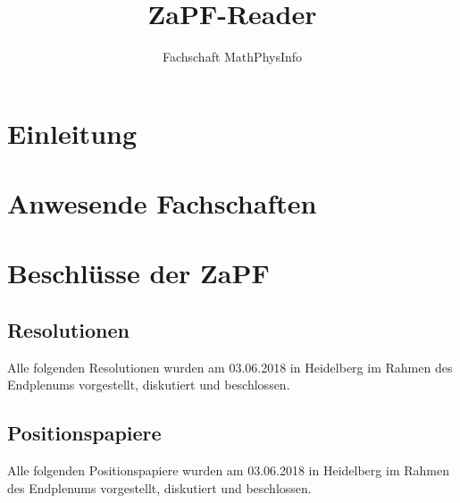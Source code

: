 \documentclass[ngerman, twoside, 10pt, openany, a5paper]{scrbook}
\begin{document}
\sloppy

\title{ZaPF-Reader}
\author{Fachschaft MathPhysInfo}
\maketitle



\newpage
\setcounter{tocdepth}{1} %
\normalsize

\dominitoc
\tableofcontents
\thispagestyle{empty}

\emptychapter

\chapter{Einleitung}
  

\chapter{Anwesende Fachschaften}
  

\tocchapter

\chapter{Beschlüsse der ZaPF}
  \label{chap:reso}
  \section{Resolutionen}
    Alle folgenden Resolutionen wurden am 03.06.2018 in Heidelberg im Rahmen des Endplenums
    vorgestellt, diskutiert und beschlossen.
      
      
      
      
      
      
      
      
      

  \newpage
  \section{Positionspapiere}
    Alle folgenden Positionspapiere wurden am 03.06.2018 in Heidelberg im Rahmen des Endplenums
    vorgestellt, diskutiert und beschlossen.
      
      
      
\end{document}
